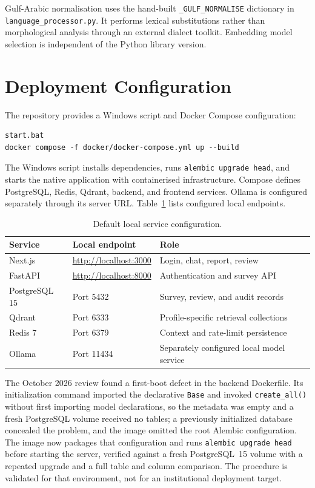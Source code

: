 Gulf-Arabic normalisation uses the hand-built
\texttt{\_GULF\_NORMALISE} dictionary in
\texttt{language\_processor.py}. It performs lexical substitutions rather
than morphological analysis through an external dialect toolkit. Embedding
model selection is independent of the Python library version.

\section{Deployment Configuration}
\label{sec:impl-docker}

The repository provides a Windows script and Docker Compose configuration:
\begin{lstlisting}
start.bat
docker compose -f docker/docker-compose.yml up --build
\end{lstlisting}

The Windows script installs dependencies, runs \texttt{alembic upgrade
head}, and starts the native application with containerised infrastructure.
Compose defines PostgreSQL, Redis, Qdrant, backend, and frontend services.
Ollama is configured separately through its server URL.
Table~\ref{tab:ch4-docker} lists configured local endpoints.

\begin{table}[htbp]
\centering
\caption{Default local service configuration.}
\label{tab:ch4-docker}
\small
\begin{tabularx}{\textwidth}{@{}l l X@{}}
\toprule
\textbf{Service} & \textbf{Local endpoint} & \textbf{Role} \\
\midrule
Next.js & \url{http://localhost:3000} & Login, chat, report, review \\
FastAPI & \url{http://localhost:8000} & Authentication and survey API \\
PostgreSQL 15 & Port 5432 & Survey, review, and audit records \\
Qdrant & Port 6333 & Profile-specific retrieval collections \\
Redis 7 & Port 6379 & Context and rate-limit persistence \\
Ollama & Port 11434 & Separately configured local model service \\
\bottomrule
\end{tabularx}
\end{table}

The October 2026 review found a first-boot defect in the backend
Dockerfile. Its initialization command imported the declarative
\texttt{Base} and invoked \texttt{create\_all()} without first importing
model declarations, so the metadata was empty and a fresh PostgreSQL
volume received no tables; a previously initialized database concealed the
problem, and the image omitted the root Alembic configuration. The image
now packages that configuration and runs \texttt{alembic upgrade head}
before starting the server, verified against a fresh PostgreSQL~15 volume
with a repeated upgrade and a full table and column comparison. The
procedure is validated for that environment, not for an institutional
deployment target.

